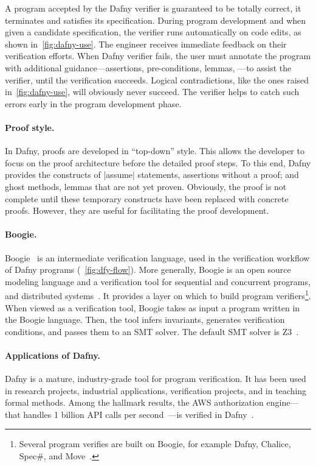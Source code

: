 A program accepted by the Dafny verifier is guaranteed to be totally correct, \ie it terminates and satisfies its specification.
During program development and when given a candidate specification, the verifier runs automatically on code edits, as shown in~\autoref{fig:dafny-use}.
The engineer receives immediate feedback on their verification efforts.
When Dafny verifier fails, the user must annotate the program with additional guidance---assertions, pre-conditions, lemmas, \etc---to assist the verifier, until the verification succeeds.
Logical contradictions, like the ones raised in~\autoref{fig:dafny-use}, will obviously never succeed.
The verifier helps to catch such errors early in the program development phase.

\paragraph*{Proof style.}
In Dafny, proofs are developed in \enquote{top-down} style.
This allows the developer to focus on the proof architecture before the detailed proof steps.
To this end, Dafny provides the constructs of \pr|assume| statements, \ie assertions without a proof;
and ghost methods, \ie lemmas that are not yet proven.
Obviously, the proof is not complete until these temporary constructs have been replaced with concrete proofs.
However, they are useful for facilitating the proof development.

\paragraph*{Boogie.}
{Boogie}~\cite{leino2008} is an intermediate verification language, used in the verification workflow of Dafny programs (\cf~\autoref{fig:dfy-flow}).
More generally, Boogie is an open source modeling language and a verification tool for sequential and concurrent programs, and distributed systems~\cite{boogie}.
It provides a layer on which to build program verifiers\footnote{
Several program verifies are built on Boogie, for example Dafny, Chalice, Spec\#, and Move~\cite{boogie}.}.
When viewed as a verification tool, Boogie takes as input a program written in the Boogie language.
Then, the tool infers invariants, generates verification conditions, and passes them to an SMT solver.
The default SMT solver is Z3~\cite{demoura2008}.

\paragraph*{Applications of Dafny.}
Dafny is a mature, industry-grade tool for program verification.
It has been used in research projects, industrial applications, verification projects, and in teaching formal methods.
Among the hallmark results, the AWS authorization engine---that handles 1 billion API calls per second~\cite{wagner2024}---is verified in Dafny~\cite{chakarov2025}.

